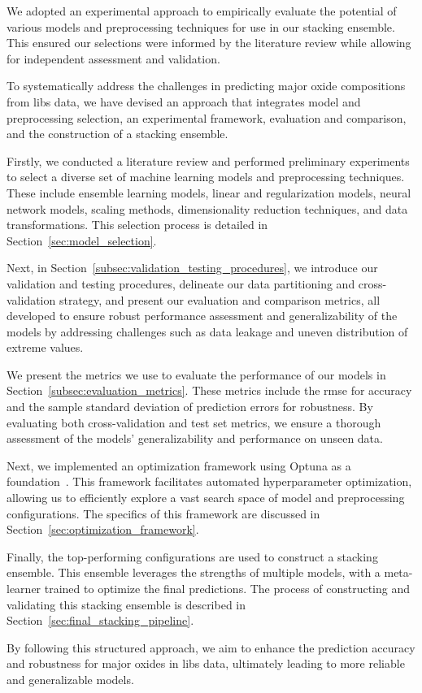 We adopted an experimental approach to empirically evaluate the potential of various models and preprocessing techniques for use in our stacking ensemble.
This ensured our selections were informed by the literature review while allowing for independent assessment and validation.

To systematically address the challenges in predicting major oxide compositions from \gls{libs} data, we have devised an approach that integrates model and preprocessing selection, an experimental framework, evaluation and comparison, and the construction of a stacking ensemble.

Firstly, we conducted a literature review and performed preliminary experiments to select a diverse set of machine learning models and preprocessing techniques.
These include ensemble learning models, linear and regularization models, neural network models, scaling methods, dimensionality reduction techniques, and data transformations.
This selection process is detailed in Section~\ref{sec:model_selection}.

Next, in Section~\ref{subsec:validation_testing_procedures}, we introduce our validation and testing procedures, delineate our data partitioning and cross-validation strategy, and present our evaluation and comparison metrics, all developed to ensure robust performance assessment and generalizability of the models by addressing challenges such as data leakage and uneven distribution of extreme values.

We present the metrics we use to evaluate the performance of our models in Section~\ref{subsec:evaluation_metrics}.
These metrics include the \gls{rmse} for accuracy and the sample standard deviation of prediction errors for robustness.
By evaluating both cross-validation and test set metrics, we ensure a thorough assessment of the models' generalizability and performance on unseen data.

Next, we implemented an optimization framework using Optuna as a foundation~\cite{optuna_2019}.
This framework facilitates automated hyperparameter optimization, allowing us to efficiently explore a vast search space of model and preprocessing configurations.
The specifics of this framework are discussed in Section~\ref{sec:optimization_framework}.

Finally, the top-performing configurations are used to construct a stacking ensemble.
This ensemble leverages the strengths of multiple models, with a meta-learner trained to optimize the final predictions.
The process of constructing and validating this stacking ensemble is described in Section~\ref{sec:final_stacking_pipeline}.

By following this structured approach, we aim to enhance the prediction accuracy and robustness for major oxides in \gls{libs} data, ultimately leading to more reliable and generalizable models.




